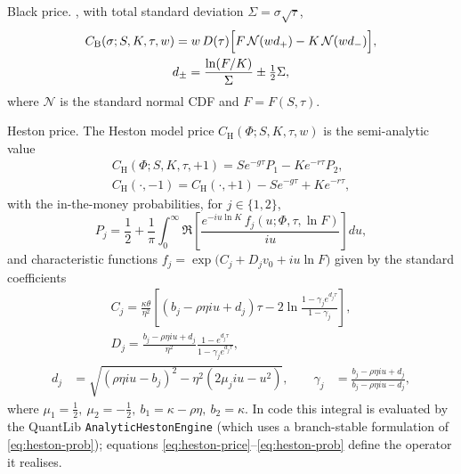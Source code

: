 \documentclass[a4paper, 11pt, reqno]{amsart}
\makeatletter
\def\paragraph{\@startsection{paragraph}{4}%
	\z@\z@{-\fontdimen2\font}%
	{\normalfont\bfseries}}
\makeatother
\begin{document}
			\paragraph{Black price.} \textcite{black1976,blackscholes1973}, with total standard deviation $\Sigma=\sigma\sqrt{\tau}$,
			\begin{equation}\label{eq:black}
				\begin{gathered}
				C_{\mathrm{B}}(\sigma; S, K, \tau, w) = w\, D(\tau)\Bigl[ F\,\mathcal{N}(w d_+) - K\,\mathcal{N}(w d_-) \Bigr], \\
				d_\pm = \frac{\ln(F/K)}{\Sigma} \pm \tfrac{1}{2}\Sigma ,
				\end{gathered}
			\end{equation}
			where $\mathcal{N}$ is the standard normal CDF and $F=F(S,\tau)$.
			
			\paragraph{Heston price.} The Heston model price $C_{\mathrm{H}}(\Phi; S,K,\tau,w)$ is
			the semi-analytic value
			\begin{equation}\label{eq:heston-price}
			\begin{gathered}
				C_{\mathrm{H}}(\Phi; S,K,\tau,+1) = S e^{-g\tau} P_1 - K e^{-r\tau} P_2, \\
				C_{\mathrm{H}}(\cdot,-1) = C_{\mathrm{H}}(\cdot,+1) - S e^{-g\tau} + K e^{-r\tau},
			\end{gathered}
			\end{equation}
			with the in-the-money probabilities, for $j\in\{1,2\}$,
			\begin{equation}\label{eq:heston-prob}
				P_j = \frac{1}{2} + \frac{1}{\pi}\int_0^\infty
				\Re\!\left[ \frac{e^{-i u \ln K}\, f_j(u; \Phi, \tau, \ln F)}{i u} \right] du ,
			\end{equation}
			and characteristic functions $f_j = \exp\bigl(C_j + D_j v_0 + i u \ln F\bigr)$ given by the standard coefficients
			\begin{equation}
				\begin{gathered}
					C_j = \frac{\kappa\theta}{\eta^2}\!\left[ (b_j - \rho\eta i u + d_j)\tau 
						- 2\ln\!\frac{1 - \gamma_j e^{d_j\tau}}{1 - \gamma_j} \right],  \\
					D_j = \frac{b_j - \rho\eta i u + d_j}{\eta^2} \frac{1 - e^{d_j\tau}}{1 - \gamma_j e^{d_j\tau}},
				\end{gathered}
			\end{equation}
				\begin{equation}
				\begin{aligned}
					d_j &= 
						\sqrt{(\rho\eta i u - b_j)^2 - \eta^2(2 \mu_j i u - u^2)},  \qquad 
					\gamma_j &= 
						\frac{b_j - \rho\eta i u + d_j}{b_j - \rho\eta i u - d_j},
				\end{aligned}
			\end{equation}
			where $\mu_1=\tfrac12,\ \mu_2=-\tfrac12,\ b_1=\kappa-\rho\eta,\ b_2=\kappa$. In code this
			integral is evaluated by the QuantLib \parencite{quantlib} \texttt{AnalyticHestonEngine} (which uses a
			branch-stable formulation of \eqref{eq:heston-prob}); equations
			\eqref{eq:heston-price}--\eqref{eq:heston-prob} define the operator it realises.
			
\end{document}
